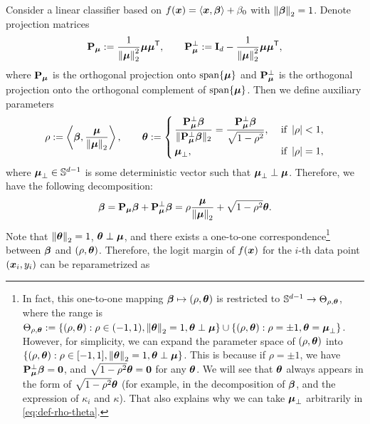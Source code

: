 \noindent
Consider a linear classifier based on $f(\text{\boldmath $x$}) = \langle \text{\boldmath $x$}, {\boldsymbol{\beta}} \rangle + \beta_0$ with $\left\|{{\boldsymbol{\beta}}}\right\|_2 = 1$. Denote projection matrices
\begin{equation*}
    \mathrm{\bf P}_{{\boldsymbol{\mu}}} := \frac{1}{\left\|{{\boldsymbol{\mu}}}\right\|_2^2} {\boldsymbol{\mu}} {\boldsymbol{\mu}}^{\sf T},
    \qquad 
    \mathrm{\bf P}_{{\boldsymbol{\mu}}}^\perp := \mathrm{\bf I}_d - \frac{1}{\left\|{{\boldsymbol{\mu}}}\right\|_2^2} {\boldsymbol{\mu}} {\boldsymbol{\mu}}^{\sf T},
\end{equation*}
where $\mathrm{\bf P}_{{\boldsymbol{\mu}}}$ is the orthogonal projection onto $\mathrm{span}\{ {\boldsymbol{\mu}} \}$ and $\mathrm{\bf P}_{{\boldsymbol{\mu}}}^\perp$ is the orthogonal projection onto the orthogonal complement of $\mathrm{span}\{ {\boldsymbol{\mu}} \}$. Then we define auxiliary parameters
\begin{equation}\label{eq:def-rho-theta}
    \rho := \left\< \vbeta, \frac{\vmu}{\norm{\vmu}_2} \right\>,
    \qquad
    \vtheta := 
    \begin{cases} 
        \, \dfrac{\bP_{\vmu}^\perp \vbeta}{\|\bP_{\vmu}^\perp \vbeta\|_2}
        = \dfrac{\bP_{\vmu}^\perp \vbeta}{\sqrt{1 - \rho^2}} , & \ \text{if} \ \abs{\rho} < 1, \\
        \, \vmu_\perp,         & \ \text{if} \ \abs{\rho} = 1, 
    \end{cases}
\end{equation}
where ${\boldsymbol{\mu}}_\perp \in \mathbb{S}^{d-1}$ is some deterministic vector such that ${\boldsymbol{\mu}}_\perp \perp {\boldsymbol{\mu}}$.
Therefore, we have the following decomposition:
\begin{equation*}
    {\boldsymbol{\beta}} = \mathrm{\bf P}_{{\boldsymbol{\mu}}} {\boldsymbol{\beta}} + \mathrm{\bf P}_{{\boldsymbol{\mu}}}^\perp {\boldsymbol{\beta}} 
    = \rho\frac{{\boldsymbol{\mu}}}{\left\|{{\boldsymbol{\mu}}}\right\|_2} + \sqrt{1 - \rho^2} {\boldsymbol{\theta}}.
\end{equation*}
Note that $\left\|{{\boldsymbol{\theta}}}\right\|_2 = 1$, ${\boldsymbol{\theta}} \perp {\boldsymbol{\mu}}$, and there exists a one-to-one correspondence\footnote{
    In fact, this one-to-one mapping ${\boldsymbol{\beta}} \mapsto (\rho, {\boldsymbol{\theta}})$ is restricted to $\mathbb{S}^{d-1} \to \Theta_{\rho,{\boldsymbol{\theta}}}$, where the range is $\Theta_{\rho,{\boldsymbol{\theta}}} :=  \{(\rho, {\boldsymbol{\theta}}): \rho \in (-1, 1), \left\|{{\boldsymbol{\theta}}}\right\|_2 = 1, {\boldsymbol{\theta}} \perp {\boldsymbol{\mu}} \} \cup \{ (\rho, {\boldsymbol{\theta}}): \rho = \pm1, {\boldsymbol{\theta}} = {\boldsymbol{\mu}}_\perp \} $. However, for simplicity, we can expand the parameter space of $(\rho, {\boldsymbol{\theta}})$ into $\{(\rho, {\boldsymbol{\theta}}): \rho \in [-1, 1], \left\|{{\boldsymbol{\theta}}}\right\|_2 = 1, {\boldsymbol{\theta}} \perp {\boldsymbol{\mu}} \}$. This is because if $\rho = \pm 1$, we have $\mathrm{\bf P}_{{\boldsymbol{\mu}}}^\perp {\boldsymbol{\beta}} = \mathrm{\bf 0}$, and $\sqrt{1 - \rho^2} {\boldsymbol{\theta}} = \mathrm{\bf 0}$ for any ${\boldsymbol{\theta}}$. We will see that ${\boldsymbol{\theta}}$ always appears in the form of $\sqrt{1 - \rho^2} {\boldsymbol{\theta}}$ (for example, in the decomposition of ${\boldsymbol{\beta}}$, and the expression of $\kappa_i$ and $\kappa$). That also explains why we can take ${\boldsymbol{\mu}}_\perp$ arbitrarily in \cref{eq:def-rho-theta}.
} between ${\boldsymbol{\beta}}$ and $(\rho, {\boldsymbol{\theta}})$. Therefore, the logit margin of $f(\text{\boldmath $x$})$ for the $i$-th data point $(\text{\boldmath $x$}_i, y_i)$ can be reparametrized as
